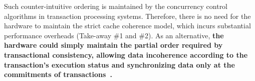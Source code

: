 



Such counter-intuitive ordering is maintained by the concurrency control algorithms in transaction processing systems.
Therefore, there is no need for the hardware to maintain the strict cache coherence model, which incurs substantial performance overheads (Take-away \#1 and \#2). As an alternative, \textbf{the hardware could simply maintain the partial order required by transactional consistency, allowing data incoherence according to the transaction's execution status and synchronizing data only at the commitments of transactions~\cite{munin_ppopp90, tcc_isca04, vtm_isca05, threadmarks_tc94, rtm_isca07, overlaytm_pact19, lamport_tc79, newdefinition_isca98}.}


